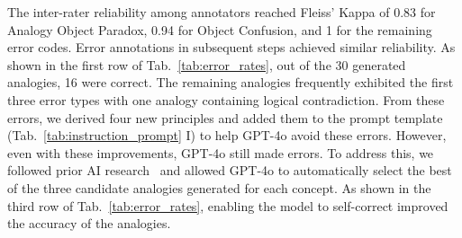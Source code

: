 {%
The inter-rater reliability among annotators reached Fleiss' Kappa of 0.83 for Analogy Object Paradox, 0.94 for Object Confusion, and 1 for the remaining error codes.
Error annotations in subsequent steps achieved similar reliability.
As shown in the first row of Tab.~\ref{tab:error_rates}, out of the 30 generated analogies, 16 were correct. 
The remaining analogies frequently exhibited the first three error types with one analogy containing logical contradiction.
From these errors, we derived four new principles and added them to the prompt template (Tab.~\ref{tab:instruction_prompt} I) to help GPT-4o avoid these errors.
However, even with these improvements, GPT-4o still made errors. 
To address this, we followed prior AI research~\cite{pan2023automatically,yuan-etal-2023-distilling,liu2024large} and allowed GPT-4o to automatically select the best of the three candidate analogies generated for each concept.
As shown in the third row of Tab.~\ref{tab:error_rates}, enabling the model to self-correct improved the accuracy of the analogies.}



